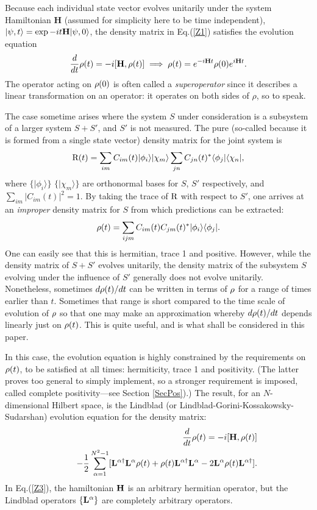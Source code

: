 \documentclass[aps,pra,amssymb, amsfonts,amsmath,showpacs, superscriptaddress,12pt]{revtex4}
\begin{document}
Because each individual state vector evolves unitarily under the system Hamiltonian {\bf H} (assumed for simplicity here to be time independent), $|\psi,t\rangle=\exp-i t{\bf H}|\psi,0\rangle$, the density matrix in Eq.(\ref{Z1}) satisfies the evolution equation 
\begin{equation}\label{Z2}
\frac{d}{dt}{\bf\rho}(t)=-i[{\bf H}, {\bf\rho}(t)]\implies{\bf\rho}(t)=e^{-i{\bf H}t}{\bf\rho}(0)e^{i{\bf H}t}.  
\end{equation}
\noindent  The operator acting on ${\bf\rho}(0)$ is often called a \textit{superoperator}\cite{Prig} since it describes a linear transformation on an operator:  it operates on both sides of $\rho$, so to speak.  

The case sometime arises where the system $S$ under consideration is a subsystem of a larger system $S+S'$, and  $S'$  is not measured. The pure (so-called because it is formed from a single state vector) density matrix for the joint system is
\[
\hbox{{\cal R}} (t)=\sum_{im}C_{im}(t)|\phi_{i}\rangle|\chi_{m}\rangle
\sum_{jn}C_{jn}(t)^{*}\langle\phi_{j}|\langle\chi_{n}|,
\]
\noindent where $\{|\phi_{i}\rangle\}$ $\{|\chi_{m}\rangle\}$ are orthonormal bases for $S$, $S'$ respectively, and $\sum_{im}|C_{im}(t)|^{2}=1$.
By taking the trace of $\hbox{{\cal R}}$ with respect to  $S'$, one arrives at an \textit{improper}\cite{dEspagnat} density matrix for $S$ from which predictions can be extracted:
\[
{\bf \rho} (t)=\sum_{ijm}C_{im}(t)C_{jm}(t)^{*}|\phi_{i}\rangle
\langle\phi_{j}|.
\]
One can easily see that this is hermitian, trace 1 and positive.  However, while the density matrix of $S+S'$ evolves unitarily, the density matrix of the subsystem $S$ evolving under the influence of  $S'$ generally does not evolve unitarily.  Nonetheless,  sometimes $d{\bf\rho}(t)/dt$ can be written in terms of ${\bf\rho}$ for a range of times earlier than $t$.  Sometimes that range is short compared to the time scale of evolution of  ${\bf\rho}$ so that one may make an approximation  whereby $d{\bf\rho}(t)/dt$ depends linearly just on ${\bf\rho}(t)$. This is quite useful, and is what shall be considered in this paper. 

In this case, the evolution equation is highly constrained by the requirements on ${\bf\rho}(t)$, to be satisfied at all times:  hermiticity, trace 1 and positivity. (The latter proves too general to simply implement, so a stronger requirement  is imposed, called complete positivity---see Section \ref{SecPos}).)  The result, for an $N$-dimensional Hilbert space, is the Lindblad\cite{Lind}  (or Lindblad-Gorini-Kossakowsky-Sudarshan\cite{Sud}) evolution equation for the density matrix:
\begin{eqnarray}\label{Z3}
&&\frac{d}{dt}{\bf\rho}(t)=-i[{\bf H},{\bf\rho}(t)]\nonumber\\
&&\quad-\frac{1}{2}\sum_{\alpha=1}^{N^{2}-1}[{\bf L}^{\alpha\dagger}{\bf L}^{\alpha}{\bf\rho}(t)
+{\bf\rho}(t){\bf L}^{\alpha\dagger}{\bf L}^{\alpha}-2{\bf L}^{\alpha}{\bf\rho}(t){\bf L}^{\alpha\dagger}].
\nonumber\\
\end{eqnarray}
In Eq.(\ref{Z3}), the hamiltonian ${\bf H}$ is an arbitrary hermitian operator, but the Lindblad operators $\{{\bf L}^{\alpha}\}$ are completely arbitrary operators.  
\end{document}
